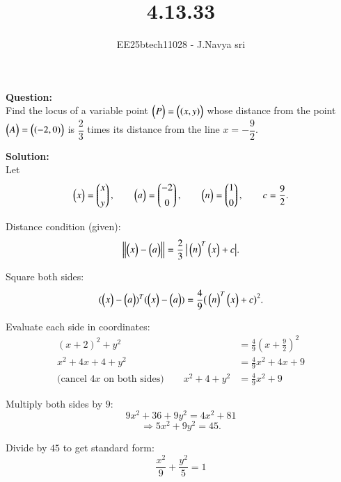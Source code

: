 \documentclass[journal]{IEEEtran}
\begin{document}

\vspace{3cm}

\title{4.13.33}
\author{EE25btech11028 - J.Navya sri}
{\let\newpage\relax\maketitle}


\textbf{Question:} \\
Find the locus of a variable point \(\begin{pmatrix}P\end{pmatrix} = \begin{pmatrix}(x, y)\end{pmatrix}\) whose distance from the point \(\begin{pmatrix}A\end{pmatrix} = \begin{pmatrix}(-2, 0)\end{pmatrix}\) is 
\(\dfrac{2}{3}\) times its distance from the line \(x = -\dfrac{9}{2}\).

\bigskip

\textbf{Solution:} \\
Let
\[
\begin{pmatrix}x\end{pmatrix}=\begin{pmatrix}x\\[4pt]y\end{pmatrix},\qquad
\begin{pmatrix}a\end{pmatrix}=\begin{pmatrix}-2\\[4pt]0\end{pmatrix},\qquad
\begin{pmatrix}n\end{pmatrix}=\begin{pmatrix}1\\[4pt]0\end{pmatrix},\qquad
c=\frac{9}{2}.
\]

Distance condition (given):
\begin{equation}
\label{eq:dist}
\left\lVert \begin{pmatrix}x\end{pmatrix}-\begin{pmatrix}a\end{pmatrix} \right\rVert
= \frac{2}{3}\,\big|\begin{pmatrix}n\end{pmatrix}^T\begin{pmatrix}x\end{pmatrix}+c\big|.
\end{equation}

Square both sides:
\begin{equation}
\label{eq:squared}
(\begin{pmatrix}x\end{pmatrix}-\begin{pmatrix}a\end{pmatrix})^T(\begin{pmatrix}x\end{pmatrix}-\begin{pmatrix}a\end{pmatrix})
= \frac{4}{9}\big(\begin{pmatrix}n\end{pmatrix}^T\begin{pmatrix}x\end{pmatrix}+c\big)^2.
\end{equation}

Evaluate each side in coordinates:
\begin{align}
(x+2)^2 + y^2
&= \frac{4}{9}\!\left(x+\frac{9}{2}\right)^{\!2} \\
x^2+4x+4 + y^2
&= \frac{4}{9}x^2 + 4x + 9 \\
\text{(cancel }4x\text{ on both sides)}\qquad
x^2 + 4 + y^2
&= \frac{4}{9}x^2 + 9
\end{align}

Multiply both sides by $9$:
\[
9x^2 + 36 + 9y^2 = 4x^2 + 81
\]
\[
\Rightarrow 5x^2 + 9y^2 = 45.
\]

Divide by $45$ to get standard form:
\begin{equation}
\boxed{\;\dfrac{x^2}{9} + \dfrac{y^2}{5} = 1\;}
\end{equation}
\end{document}
